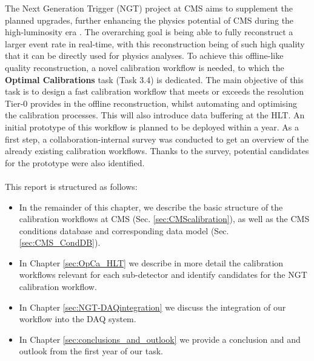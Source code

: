 The Next Generation Trigger (NGT) project at CMS aims to supplement the planned upgrades, further enhancing the physics potential of CMS during the high-luminosity era \cite{NGT_proposal}. The overarching goal is being able to fully reconstruct a larger event rate in real-time, with this reconstruction being of such high quality that it can be directly used for physics analyses.
\newline \newline
To achieve this offline-like quality reconstruction, a novel calibration workflow is needed, to which the \textbf{Optimal Calibrations} task (Task 3.4) is dedicated. The main objective of this task is to design a fast calibration workflow that meets or exceeds the resolution Tier-0 provides in the offline reconstruction, whilst automating and optimising the calibration processes. This will also introduce data buffering at the HLT. An initial prototype of this workflow is planned to be deployed within a year. As a first step, a collaboration-internal survey was conducted to get an overview of the already existing calibration workflows. Thanks to the survey, potential candidates for the prototype were also identified. \\ \\ 
This report is structured as follows:
\begin{itemize}
    \item In the remainder of this chapter, we describe the basic structure of the calibration workflows at CMS (Sec. \ref{sec:CMScalibration}), as well as the CMS conditions database and corresponding data model (Sec. \ref{sec:CMS_CondDB}).
    \item In Chapter \ref{sec:OpCa_HLT} we describe in more detail the calibration workflows relevant for each sub-detector and identify candidates for the NGT calibration workflow. 
    \item In Chapter \ref{sec:NGT-DAQintegration} we discuss the integration of our workflow into the DAQ system. 
    \item In Chapter \ref{sec:conclusions_and_outlook} we provide a conclusion and and outlook from the first year of our task.
\end{itemize}

